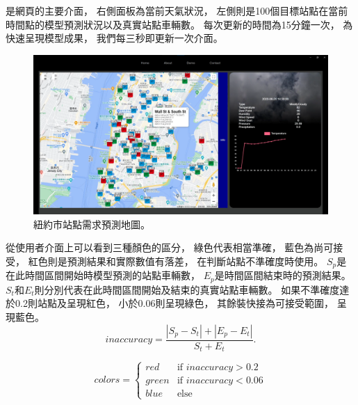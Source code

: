 \documentclass[a4paper,12pt]{extarticle}
\begin{document}
            是網頁的主要介面，
            右側面板為當前天氣狀況，
            左側則是100個目標站點在當前時間點的模型預測狀況以及真實站點車輛數。
            每次更新的時間為15分鐘一次，
            為快速呈現模型成果，
            我們每三秒即更新一次介面。
            \begin{figure}[htb]
                \centering
                \includegraphics[width=\textwidth]{nstc_adjust_image.png}
                \caption{
                    紐約市站點需求預測地圖。
                }
                \label{fig:web-view}
            \end{figure}
            從使用者介面上可以看到三種顏色的區分，
            綠色代表相當準確，
            藍色為尚可接受，
            紅色則是預測結果和實際數值有落差，
            在判斷站點不準確度時使用。
            $S_p$是在此時間區間開始時模型預測的站點車輛數，
            $E_p$是時間區間結束時的預測結果。
            $S_t$和$E_t$則分別代表在此時間區間開始及結束的真實站點車輛數。
            如果不準確度達於0.2則站點及呈現紅色，
            小於0.06則呈現綠色，
            其餘裝快接為可接受範圍，
            呈現藍色。
            \begin{equation}
                \label{acc_equ}
                \text{$inaccuracy$} = \frac{|S_p-S_t|+|E_p-E_t|}{S_t+E_t}.
            \end{equation}

            \[
            colors =
            \begin{cases}
                red & \text{if $inaccuracy>0.2$} \\
                green & \text{if $inaccuracy<0.06$} \\
                blue & \text{else} 
            \end{cases}
            \]
\end{document}
